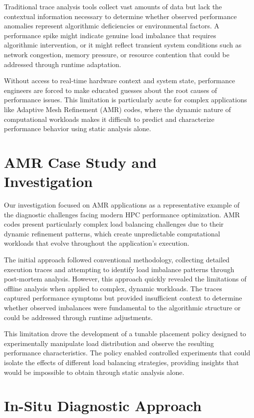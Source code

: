 Traditional trace analysis tools collect vast amounts of data but lack the contextual information
necessary to determine whether observed performance anomalies represent algorithmic deficiencies
or environmental factors.
A performance spike might indicate genuine load imbalance that requires algorithmic intervention,
or it might reflect transient system conditions such as network congestion, memory pressure, or
resource contention that could be addressed through runtime adaptation.

Without access to real-time hardware context and system state, performance engineers are forced
to make educated guesses about the root causes of performance issues.
This limitation is particularly acute for complex applications like Adaptive Mesh Refinement (AMR)
codes, where the dynamic nature of computational workloads makes it difficult to predict and
characterize performance behavior using static analysis alone.

\section{AMR Case Study and Investigation}

Our investigation focused on AMR applications as a representative example of the diagnostic
challenges facing modern HPC performance optimization.
AMR codes present particularly complex load balancing challenges due to their dynamic refinement
patterns, which create unpredictable computational workloads that evolve throughout the
application's execution.

The initial approach followed conventional methodology, collecting detailed execution traces and
attempting to identify load imbalance patterns through post-mortem analysis.
However, this approach quickly revealed the limitations of offline analysis when applied to
complex, dynamic workloads.
The traces captured performance symptoms but provided insufficient context to determine whether
observed imbalances were fundamental to the algorithmic structure or could be addressed through
runtime adjustments.

This limitation drove the development of a tunable placement policy designed to experimentally
manipulate load distribution and observe the resulting performance characteristics.
The policy enabled controlled experiments that could isolate the effects of different load
balancing strategies, providing insights that would be impossible to obtain through static
analysis alone.

\section{In-Situ Diagnostic Approach}


